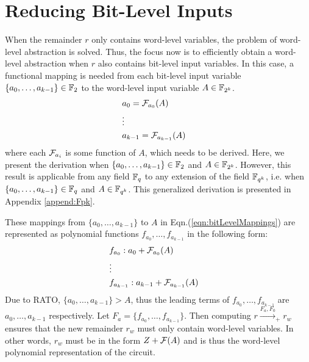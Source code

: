\section{Reducing Bit-Level Inputs}

When the remainder $r$ only contains word-level variables, the problem
of word-level abstraction is solved. Thus, the focus now is to 
efficiently obtain a word-level abstraction when $r$ also contains 
bit-level input variables. 
In this case, a functional mapping is needed from each bit-level input 
variable $\{a_0, \dots, a_{k-1}\}\in{\mathbb{F}}_2$ to the word-level input variable $A\in{\mathbb{F}}_{2^k}$.
\begin{eqnarray}
&a_0 = {\mathcal{F}}_{a_0}(A)& \nonumber \\
&\vdots&  \label{eqn:bitLevelMappings}\\
&a_{k-1} = {\mathcal{F}}_{a_{k-1}}(A)& \nonumber
\end{eqnarray}
where each ${\mathcal{F}}_{a_i}$ is some function of $A$, which needs to be derived.
Here, we present the derivation when $\{a_0,\dots,a_{k-1}\}\in{\mathbb{F}}_2$ and $A\in{\mathbb{F}}_{2^k}$.
However, this result is applicable from any field ${\mathbb{F}}_q$ to any extension
of the field ${\mathbb{F}}_{q^k}$, i.e. when $\{a_0,\dots,a_{k-1}\}\in{\mathbb{F}}_q$ and $A\in{\mathbb{F}}_{q^k}$. 
This generalized derivation is presented in Appendix \ref{append:Fpk}.

These mappings from $\{a_0, \dots, a_{k-1}\}$ to $A$ in Eqn.(\ref{eqn:bitLevelMappings})
are represented as polynomial functions $f_{a_0}, \dots, f_{a_{k-1}}$ in the
following form:
\begin{eqnarray}
&f_{a_0} : a_0 + {\mathcal{F}}_{a_0}(A)& \nonumber \\
&\vdots& \label{eqn:bitLevelPolynomials} \\
&f_{a_{k-1}} : a_{k-1} + {\mathcal{F}}_{a_{k-1}}(A)& \nonumber
\end{eqnarray}
Due to RATO, 
$\{a_{0}, \dots, a_{k-1}\} > A$, thus the leading terms of 
$f_{a_0},\dots,f_{a_{k-1}}$ are $a_{0}, \dots, a_{k-1}$ respectively.
Let $F_a = \{f_{a_0},\dots,f_{a_{k-1}}\}$. 
Then computing 
$r \xrightarrow{F_a,F_0}_+ r_w$ ensures that the new 
remainder $r_w$ must only contain word-level variables. In other words, 
$r_w$ must be in the form $Z + {\mathcal{F}}(A)$ and is thus the word-level polynomial 
representation of the circuit.


